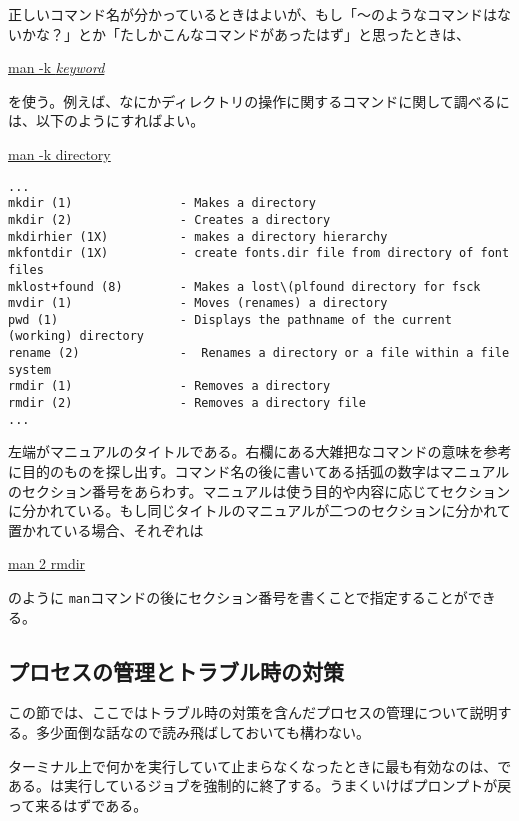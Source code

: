 正しいコマンド名が分かっているときはよいが、もし「〜のようなコマンドはないかな？」とか「たしかこんなコマンドがあったはず」と思ったときは、
\begin{commandline2}
\prompt \underline{man -k {\it keyword}}
\end{commandline2} \noindent
を使う。例えば、なにかディレクトリの操作に関するコマンドに関して調べるには、以下のようにすればよい。
\begin{commandline2}
\prompt \underline{man -k directory}
\vspace*{-.8em} 
\begin{verbatim}
...
mkdir (1)               - Makes a directory
mkdir (2)               - Creates a directory
mkdirhier (1X)          - makes a directory hierarchy
mkfontdir (1X)          - create fonts.dir file from directory of font files
mklost+found (8)        - Makes a lost\(plfound directory for fsck
mvdir (1)               - Moves (renames) a directory
pwd (1)                 - Displays the pathname of the current (working) directory
rename (2)              -  Renames a directory or a file within a file system
rmdir (1)               - Removes a directory
rmdir (2)               - Removes a directory file
...
\end{verbatim}
\end{commandline2} \noindent
\noindent 左端がマニュアルのタイトルである。右欄にある大雑把なコマンドの意味を参考に目的のものを探し出す。コマンド名の後に書いてある括弧の数字はマニュアルのセクション番号をあらわす。マニュアルは使う目的や内容に応じてセクションに分かれている。もし同じタイトルのマニュアルが二つのセクションに分かれて置かれている場合、それぞれは
\begin{commandline2}
\prompt \underline{man 2 rmdir}
\end{commandline2} \noindent
のように {\tt man}コマンドの後にセクション番号を書くことで指定することができる。

\subsection{プロセスの管理とトラブル時の対策}
\label{chap: recover}
この節では、ここではトラブル時の対策を含んだプロセスの管理について説明する。多少面倒な話なので読み飛ばしておいても構わない。

ターミナル上で何かを実行していて止まらなくなったときに最も有効なのは、である。は実行しているジョブを強制的に終了する。うまくいけばプロンプトが戻って来るはずである。

